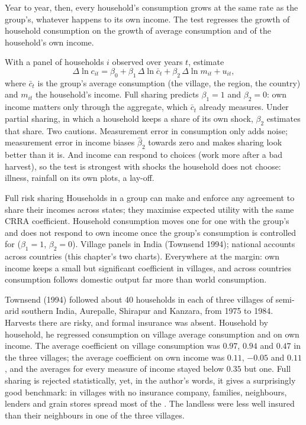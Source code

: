 Year to year, then, every household's consumption grows at the same rate as the group's, whatever
happens to its own income. The test regresses the growth of household consumption on the growth of
average consumption and of the household's own income.

\begin{measure}
With a panel of households $i$ observed over years $t$, estimate
\[
\Delta\ln c_{it} = \beta_0 + \beta_1\,\Delta\ln\bar c_t + \beta_2\,\Delta\ln m_{it} + u_{it},
\]
where $\bar c_t$ is the group's average consumption (the village, the region, the country) and
$m_{it}$ the household's income. Full sharing predicts $\beta_1 = 1$ and $\beta_2 = 0$: own income
matters only through the aggregate, which $\bar c_t$ already measures. Under partial sharing, in which
a household keeps a share of its own shock, $\beta_2$ estimates that share. Two cautions.
Measurement error in consumption only adds noise; measurement error in income biases $\hat\beta_2$
towards zero and makes sharing look better than it is. And income can respond to choices (work
more after a bad harvest), so the test is strongest with shocks the household does not choose:
illness, rainfall on its own plots, a lay-off.
\end{measure}

\begin{model}{Full risk sharing}
\assumes Households in a group can make and enforce any agreement to share their incomes across
states; they maximise expected utility with the same CRRA coefficient.
\predicts Household consumption moves one for one with the group's and does not respond to own
income once the group's consumption is controlled for ($\beta_1 = 1$, $\beta_2 = 0$).
\tested Village panels in India (Townsend 1994); national accounts across countries (this chapter's
two charts).
\breaks Everywhere at the margin: own income keeps a small but significant coefficient in villages,
and across countries consumption follows domestic output far more than world consumption.
\end{model}

\begin{record}
Townsend (1994) followed about 40 households in each of three villages of semi-arid southern India,
Aurepalle, Shirapur and Kanzara, from 1975 to 1984.
Harvests there are risky, and formal insurance was absent. Household by household, he regressed
consumption on village average consumption and on own income. The average coefficient on village
consumption was $0.97$, $0.94$ and $0.47$ in the three villages; the average coefficient on own income
was $0.11$, $-0.05$ and $0.11$, and the averages for every measure of income stayed below $0.35$ but
one. Full sharing is rejected statistically, yet, in the author's words, it gives a surprisingly good
benchmark: in villages with no insurance company, families, neighbours, lenders and grain stores
spread most of the . The landless were less well insured than their neighbours in
one of the three villages.
\end{record}

